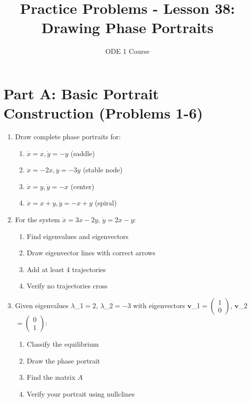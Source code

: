 \documentclass[12pt]{article}
\title{Practice Problems - Lesson 38: Drawing Phase Portraits}
\author{ODE 1 Course}
\date{}
\begin{document}
\maketitle

\section*{Part A: Basic Portrait Construction (Problems 1-6)}

\begin{enumerate}
\item Draw complete phase portraits for:
\begin{enumerate}[label=(\alph*)]
    \item $\dot{x} = x, \dot{y} = -y$ (saddle)
    \item $\dot{x} = -2x, \dot{y} = -3y$ (stable node)
    \item $\dot{x} = y, \dot{y} = -x$ (center)
    \item $\dot{x} = x + y, \dot{y} = -x + y$ (spiral)
\end{enumerate}

\item For the system $\dot{x} = 3x - 2y$, $\dot{y} = 2x - y$:
\begin{enumerate}[label=(\alph*)]
    \item Find eigenvalues and eigenvectors
    \item Draw eigenvector lines with correct arrows
    \item Add at least 4 trajectories
    \item Verify no trajectories cross
\end{enumerate}

\item Given eigenvalues $\lambda$_{1}$ = 2$, $\lambda$_{2}$ = -3$ with eigenvectors $\mathbf{v}$_{1}$ = \begin{pmatrix} 1 \\ 0 \end{pmatrix}$, $\mathbf{v}$_{2}$ = \begin{pmatrix} 0 \\ 1 \end{pmatrix}$:
\begin{enumerate}[label=(\alph*)]
    \item Classify the equilibrium
    \item Draw the phase portrait
    \item Find the matrix $A$
    \item Verify your portrait using nullclines
\end{enumerate}


\end{enumerate}
\end{document}
